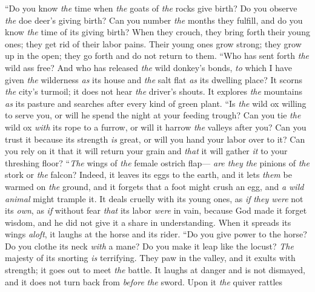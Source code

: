 \begin{biblechapter} %
\verse “Do you know \textit{the} time when \textit{the} goats of \textit{the} rocks give birth? 
Do you observe \textit{the} doe deer’s giving birth?
\verse Can you number \textit{the} months they fulfill, 
and do you know \textit{the} time of its giving birth?
\verse When they crouch, they bring forth their young ones; 
they get rid of their labor pains.
\verse Their young ones grow strong; they grow up in the open; 
they go forth and do not return to them.
\verse “Who has sent forth \textit{the} wild ass free? 
And who has released \textit{the} wild donkey’s bonds,
\verse \textit{to} which I have given \textit{the} wilderness \textit{as} its house 
and \textit{the} salt flat \textit{as} its dwelling place?
\verse It scorns \textit{the} city’s turmoil; 
it does not hear \textit{the} driver’s shouts.
\verse It explores \textit{the} mountains \textit{as} its pasture 
and searches after every kind of green plant.
\verse “Is \textit{the} wild ox willing to serve you, 
or will he spend the night at your feeding trough?
\verse Can you tie \textit{the} wild ox \textit{with} its rope to a furrow, 
or will it harrow \textit{the} valleys after you?
\verse Can you trust it because its strength \textit{is} great, 
or will you hand your labor over to it?
\verse Can you rely on it that it will return your grain 
and \textit{that} it will gather \textit{it} to your threshing floor?
\verse “\textit{The} wings of \textit{the} female ostrich flap— 
\textit{are they} \textit{the} pinions of \textit{the} stork or \textit{the} falcon?
\verse Indeed, it leaves its eggs to the earth, 
and it lets \textit{them} be warmed on \textit{the} ground,
\verse and it forgets that a foot might crush an egg, 
and \textit{a wild animal} might trample it.
\verse It deals cruelly with its young ones, as \textit{if} \textit{they were} not its \textit{own}, 
as \textit{if} without fear \textit{that} its labor \textit{were} in vain,
\verse because God made it forget wisdom, 
and he did not give it a share in understanding.
\verse When it spreads its wings \textit{aloft}, 
it laughs at the horse and its rider.
\verse “Do you give power to the horse? 
Do you clothe its neck \textit{with} a mane?
\verse Do you make it leap like the locust? 
\textit{The} majesty of its snorting \textit{is} terrifying.
\verse They paw in the valley, and it exults with strength; 
it goes out to meet \textit{the} battle.
\verse It laughs at danger and is not dismayed, 
and it does not turn back from \textit{before} \textit{the} sword.
\verse Upon it \textit{the} quiver rattles 

\end{biblechapter}
